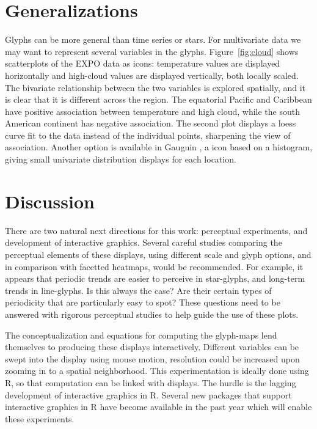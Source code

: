 \documentclass[oneside]{article}
\begin{document}
\section{Generalizations}

Glyphs can be more general than time series or stars. For multivariate data we may want to represent several variables in the glyphs. Figure~\ref{fig:cloud} shows scatterplots of the EXPO data as icons: temperature values are displayed horizontally and high-cloud values are displayed vertically, both locally scaled. The bivariate relationship between the two variables is explored spatially, and it is clear that it is different across the region. The equatorial Pacific and Caribbean have positive association between temperature and high cloud, while the south American continent has negative association. The second plot displays a loess curve fit to the data instead of the individual points, sharpening the view of association. Another option is available in Gauguin \citep{gribov:2006}, a icon based on a histogram, giving small univariate distribution displays for each location.

\section{Discussion}

There are two natural next directions for this work: perceptual experiments, and development of interactive graphics. Several careful studies comparing the perceptual elements of these displays, using different scale and glyph options, and in comparison with facetted heatmaps, would be recommended. For example, it appears that periodic trends are easier to perceive in star-glyphs, and long-term trends in line-glyphs. Is this always the case? Are their certain types of periodicity that are particularly easy to spot? These questions need to be answered with rigorous perceptual studies to help guide the use of these plots.

The conceptualization and equations for computing the glyph-maps lend themselves to producing these displays interactively. Different variables can be swept into the display using mouse motion, resolution could be increased upon zooming in to a spatial neighborhood. This experimentation is ideally done using R, so that computation can be linked with displays. The hurdle is the lagging development of interactive graphics in R. Several new packages that support interactive graphics in R have become available in the past year \citep{qtbase, qtpaint, plumbr} which will enable these experiments.
\end{document}
